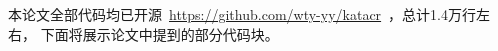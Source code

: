 

本论文全部代码均已开源~\url{https://github.com/wty-yy/katacr}~，总计1.4万行左右，
下面将展示论文中提到的部分代码块。
\label{app-generator}
\label{app-state-feature}
\label{app-action-feature}
\label{app-reward-feature}
